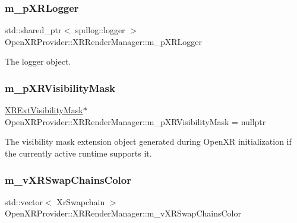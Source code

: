 \subsubsection{\texorpdfstring{m\_pXRLogger}{m\_pXRLogger}}
{\footnotesize\ttfamily std\+::shared\+\_\+ptr$<$ spdlog\+::logger $>$ Open\+X\+R\+Provider\+::\+X\+R\+Render\+Manager\+::m\+\_\+p\+X\+R\+Logger\hspace{0.3cm}{\ttfamily [private]}}



The logger object. 

\mbox{\label{class_open_x_r_provider_1_1_x_r_render_manager_af5bf048e754360884f06006598d5682d}} 
\subsubsection{\texorpdfstring{m\_pXRVisibilityMask}{m\_pXRVisibilityMask}}
{\footnotesize\ttfamily \mbox{\hyperlink{class_open_x_r_provider_1_1_x_r_ext_visibility_mask}{X\+R\+Ext\+Visibility\+Mask}}$\ast$ Open\+X\+R\+Provider\+::\+X\+R\+Render\+Manager\+::m\+\_\+p\+X\+R\+Visibility\+Mask = nullptr\hspace{0.3cm}{\ttfamily [private]}}



The visibility mask extension object generated during Open\+XR initialization if the currently active runtime supports it. 

\mbox{\label{class_open_x_r_provider_1_1_x_r_render_manager_a6cbe21e466e02dcf45fefe062aed4c9f}} 
\subsubsection{\texorpdfstring{m\_vXRSwapChainsColor}{m\_vXRSwapChainsColor}}
{\footnotesize\ttfamily std\+::vector$<$ Xr\+Swapchain $>$ Open\+X\+R\+Provider\+::\+X\+R\+Render\+Manager\+::m\+\_\+v\+X\+R\+Swap\+Chains\+Color\hspace{0.3cm}{\ttfamily [private]}}



